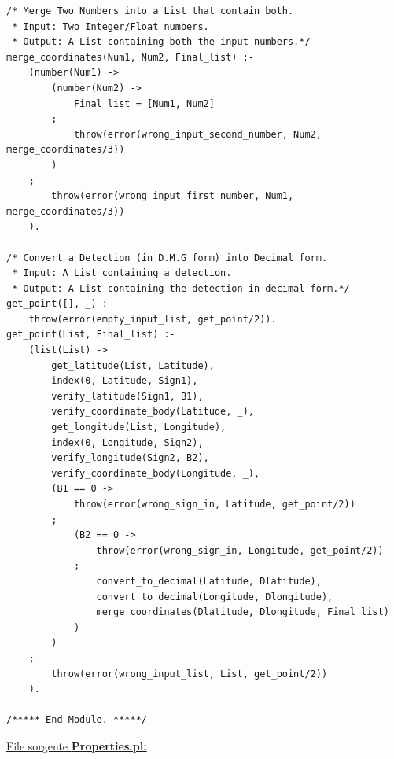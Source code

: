 \documentclass{article}
\begin{document}
\begin{lstlisting}
/* Merge Two Numbers into a List that contain both.
 * Input: Two Integer/Float numbers.
 * Output: A List containing both the input numbers.*/
merge_coordinates(Num1, Num2, Final_list) :-
    (number(Num1) -> 
        (number(Num2) -> 
            Final_list = [Num1, Num2]
        ;
            throw(error(wrong_input_second_number, Num2, merge_coordinates/3))
        )
    ;
        throw(error(wrong_input_first_number, Num1, merge_coordinates/3))
    ).

/* Convert a Detection (in D.M.G form) into Decimal form.
 * Input: A List containing a detection.
 * Output: A List containing the detection in decimal form.*/
get_point([], _) :-
    throw(error(empty_input_list, get_point/2)).
get_point(List, Final_list) :-
    (list(List) -> 
        get_latitude(List, Latitude),
        index(0, Latitude, Sign1),
        verify_latitude(Sign1, B1),
        verify_coordinate_body(Latitude, _),
        get_longitude(List, Longitude),
        index(0, Longitude, Sign2),
        verify_longitude(Sign2, B2),
        verify_coordinate_body(Longitude, _),
        (B1 == 0 ->
            throw(error(wrong_sign_in, Latitude, get_point/2))
        ;
            (B2 == 0 ->
                throw(error(wrong_sign_in, Longitude, get_point/2))
            ;
                convert_to_decimal(Latitude, Dlatitude),
                convert_to_decimal(Longitude, Dlongitude),
                merge_coordinates(Dlatitude, Dlongitude, Final_list)
            )
        )
    ;
        throw(error(wrong_input_list, List, get_point/2))
    ).
    
/***** End Module. *****/
\end{lstlisting}
\underline{File sorgente \textbf{Properties.pl:}}
\lstset{language=Prolog}
\end{document}
